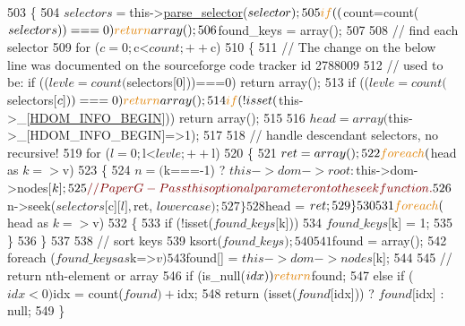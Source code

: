 \begin{DoxyCode}
503     \{
504         $selectors = $this->\hyperlink{classsimple__html__dom__node_a39d57c8087a0b463eeb942a1d8042013}{parse\_selector}($selector);
505         \textcolor{keywordflow}{if} (($count=count($selectors))===0) \textcolor{keywordflow}{return} array();
506         $found\_keys = array();
507 
508         \textcolor{comment}{// find each selector}
509         \textcolor{keywordflow}{for} ($c=0; $c<$count; ++$c)
510         \{
511             \textcolor{comment}{// The change on the below line was documented on the sourceforge code tracker id 2788009}
512             \textcolor{comment}{// used to be: if (($levle=count($selectors[0]))===0) return array();}
513             \textcolor{keywordflow}{if} (($levle=count($selectors[$c]))===0) \textcolor{keywordflow}{return} array();
514             \textcolor{keywordflow}{if} (!isset($this->\_[\hyperlink{simple__html__dom_8php_a05decffbdf780e841c1198d24aa889a1}{HDOM\_INFO\_BEGIN}])) \textcolor{keywordflow}{return} array();
515 
516             $head = array($this->\_[HDOM\_INFO\_BEGIN]=>1);
517 
518             \textcolor{comment}{// handle descendant selectors, no recursive!}
519             \textcolor{keywordflow}{for} ($l=0; $l<$levle; ++$l)
520             \{
521                 $ret = array();
522                 \textcolor{keywordflow}{foreach} ($head as $k=>$v)
523                 \{
524                     $n = ($k===-1) ? $this->dom->root : $this->dom->nodes[$k];
525                     \textcolor{comment}{//PaperG - Pass this optional parameter on to the seek function.}
526                     $n->seek($selectors[$c][$l], $ret, $lowercase);
527                 \}
528                 $head = $ret;
529             \}
530 
531             \textcolor{keywordflow}{foreach} ($head as $k=>$v)
532             \{
533                 \textcolor{keywordflow}{if} (!isset($found\_keys[$k]))
534                     $found\_keys[$k] = 1;
535             \}
536         \}
537 
538         \textcolor{comment}{// sort keys}
539         ksort($found\_keys);
540 
541         $found = array();
542         \textcolor{keywordflow}{foreach} ($found\_keys as $k=>$v)
543             $found[] = $this->dom->nodes[$k];
544 
545         \textcolor{comment}{// return nth-element or array}
546         \textcolor{keywordflow}{if} (is\_null($idx)) \textcolor{keywordflow}{return} $found;
547         \textcolor{keywordflow}{else} \textcolor{keywordflow}{if} ($idx<0) $idx = count($found) + $idx;
548         \textcolor{keywordflow}{return} (isset($found[$idx])) ? $found[$idx] : null;
549     \}
\end{DoxyCode}
\hypertarget{classsimple__html__dom__node_a03d7c0efb45d013cc1421612c719e867}{}\label{classsimple__html__dom__node_a03d7c0efb45d013cc1421612c719e867} 

